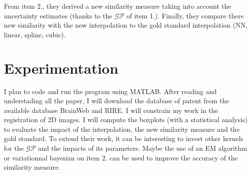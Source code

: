 \documentclass[10pt,twocolumn,letterpaper]{article}
\begin{document}
From item 2., they derived a new similarity measure taking into account the uncertainty estimates (thanks to the $\mathcal{GP}$ of item 1.).
Finally, they compare there new similarity with the new interpolation to the gold standard interpolation (NN, linear, spline, cubic).

\section{Experimentation}

I plan to code and run the program using MATLAB.
After reading and understading all the paper, I will download the database of patent from the available database BrainWeb and RIRE.
I will constrain my work in the registration of 2D images. I will compute the boxplots (with a statistical analysis) to evaluate the impact of the interpolation, the new similarity measure and the gold standard.
To extend their work, it can be interesting to invest other kernels for the $\mathcal{GP}$ and the impacts of its parameters. Maybe the use of an EM algorithm or variationnal bayesian on item 2. can be used to improve the accuracy of the similarity measure.

{\small


}
\end{document}
